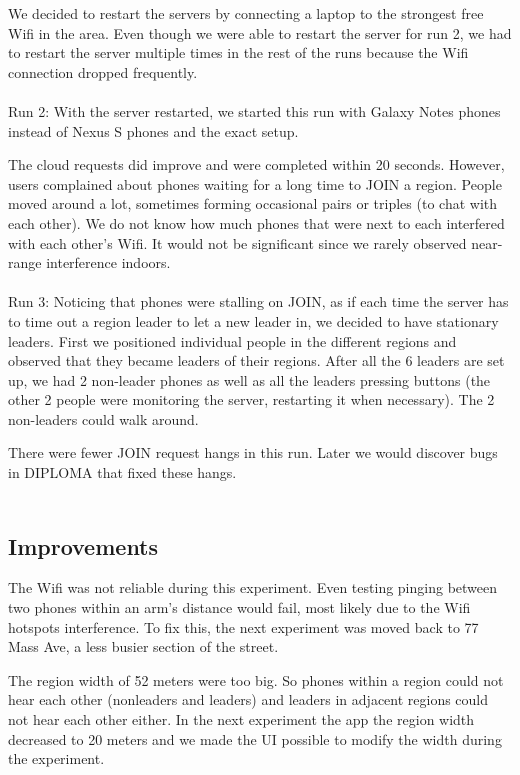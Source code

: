 We decided to restart the servers by connecting a laptop to the strongest free Wifi in the area. Even though we were able to restart the server for run 2, we had to restart the server multiple times in the rest of the runs because the Wifi connection dropped frequently.
\\
\\
Run 2:
With the server restarted, we started this run with Galaxy Notes phones instead of Nexus S phones and the exact setup.

The cloud requests did improve and were completed within 20 seconds. However, users complained about phones waiting for a long time to JOIN a region.  People moved around a lot, sometimes forming occasional pairs or triples (to chat with each other). We do not know how much phones that were next to each interfered with each other's Wifi. It would not be significant since we rarely observed near-range interference indoors. 
\\
\\
Run 3:
Noticing that phones were stalling on JOIN, as if each time the server has to time out a region leader to let a new leader in, we decided to have stationary leaders. First we positioned individual people in the different regions and observed that they became leaders of their regions. After all the 6 leaders are set up, we had 2 non-leader phones as well as all the leaders pressing buttons (the other 2 people were monitoring the server, restarting it when necessary). The 2 non-leaders could walk around. 

There were fewer JOIN request hangs in this run. Later we would discover bugs in DIPLOMA that fixed these hangs.
\\
\\
\subsection{Improvements}
The Wifi was not reliable during this experiment. Even testing pinging between two phones within an arm's distance would fail, most likely due to the Wifi hotspots interference. To fix this, the next experiment was moved back to 77 Mass Ave, a less busier section of the street.

The region width of 52 meters were too big. So phones within a region could not hear each other (nonleaders and leaders) and leaders in adjacent regions could not hear each other either. In the next experiment the app the region width decreased to 20 meters and we made the UI possible to modify the width during the experiment.

